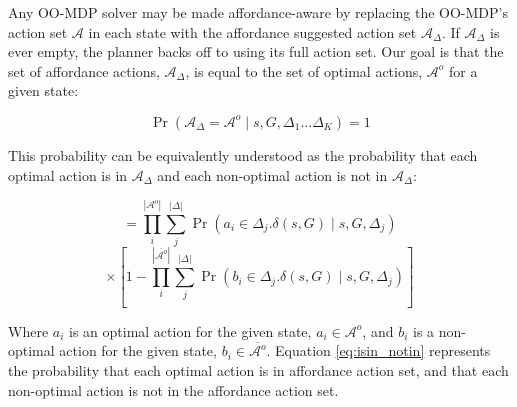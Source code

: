 \documentclass[conference]{IEEEtran}
\newcommand{\dnote}[1]{\textcolor{Green}{\textbf{D: #1}}}
\newcommand{\enote}[1]{\textcolor{Red}{\textbf{E: #1}}}
\begin{document}
Any OO-MDP solver may be made affordance-aware by replacing the OO-MDP's action set $\mathcal{A}$ in each state with the affordance suggested action set $\mathcal{A}_\Delta$. If $\mathcal{A}_\Delta$ is ever empty, the planner backs off to using its full action set. Our goal is that the set of affordance actions, $\mathcal{A}_{\Delta}$, is equal to the set of optimal actions, $\mathcal{A}^o$ for a given state:

\begin{equation} 
\Pr( \mathcal{A}_{\Delta} = \mathcal{A}^o \mid s, G, \Delta_1 \dots \Delta_K) = 1
\label{eq:opt}
\end{equation}


This probability can be equivalently understood as the probability that each
optimal action is in $\mathcal{A}_{\Delta}$ and each non-optimal action is not in $\mathcal{A}_{\Delta}$: %

\begin{equation*}
= \prod_i^{|\mathcal{A}^o|} \sum_j^{|\Delta|} \Pr(a_i \in \Delta_j.\delta(s,G) \mid s, G, \Delta_j)\end{equation*}
\begin{equation}
\times \left[1 - \prod_i^{|\overline{\mathcal{A}^o}|} \sum_j^{|\Delta|} \Pr(b_i \in \Delta_j.\delta(s,G) \mid s, G, \Delta_j)\right]
\label{eq:isin_notin}
\end{equation}

Where $a_i$ is an optimal action for the given state, $a_i \in \mathcal{A}^o$,
and $b_i$ is a non-optimal action for the given state, $b_i \in \overline{\mathcal{A}^o}$.
Equation \ref{eq:isin_notin} represents the probability that each optimal action is in
affordance action set, and that each non-optimal action is not in the affordance action set.
\end{document}
